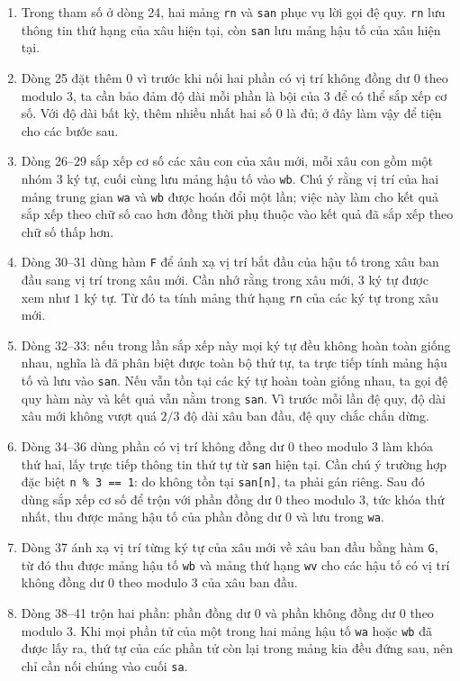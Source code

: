 \documentclass[11pt]{article}
\begin{document}
\begin{enumerate}
  \item Trong tham số ở dòng 24, hai mảng \texttt{rn} và \texttt{san} phục vụ
  lời gọi đệ quy. \texttt{rn} lưu thông tin thứ hạng của xâu hiện tại, còn
  \texttt{san} lưu mảng hậu tố của xâu hiện tại.

  \item Dòng 25 đặt thêm $0$ vì trước khi nối hai phần có vị trí không đồng dư
  $0$ theo modulo $3$, ta cần bảo đảm độ dài mỗi phần là bội của $3$ để có thể
  sắp xếp cơ số. Với độ dài bất kỳ, thêm nhiều nhất hai số $0$ là đủ; ở đây
  làm vậy để tiện cho các bước sau.

  \item Dòng 26--29 sắp xếp cơ số các xâu con của xâu mới, mỗi xâu con gồm
  một nhóm $3$ ký tự, cuối cùng lưu mảng hậu tố vào \texttt{wb}. Chú ý rằng vị
  trí của hai mảng trung gian \texttt{wa} và \texttt{wb} được hoán đổi một lần;
  việc này làm cho kết quả sắp xếp theo chữ số cao hơn đồng thời phụ thuộc vào
  kết quả đã sắp xếp theo chữ số thấp hơn.

  \item Dòng 30--31 dùng hàm \texttt{F} để ánh xạ vị trí bắt đầu của hậu tố
  trong xâu ban đầu sang vị trí trong xâu mới. Cần nhớ rằng trong xâu mới,
  $3$ ký tự được xem như $1$ ký tự. Từ đó ta tính mảng thứ hạng
  \texttt{rn} của các ký tự trong xâu mới.

  \item Dòng 32--33: nếu trong lần sắp xếp này mọi ký tự đều không hoàn toàn
  giống nhau, nghĩa là đã phân biệt được toàn bộ thứ tự, ta trực tiếp tính
  mảng hậu tố và lưu vào \texttt{san}. Nếu vẫn tồn tại các ký tự hoàn toàn
  giống nhau, ta gọi đệ quy hàm này và kết quả vẫn nằm trong \texttt{san}. Vì
  trước mỗi lần đệ quy, độ dài xâu mới không vượt quá $2/3$ độ dài xâu ban
  đầu, đệ quy chắc chắn dừng.

  \item Dòng 34--36 dùng phần có vị trí không đồng dư $0$ theo modulo $3$ làm
  khóa thứ hai, lấy trực tiếp thông tin thứ tự từ \texttt{san} hiện tại. Cần
  chú ý trường hợp đặc biệt \texttt{n \% 3 == 1}: do không tồn tại
  \texttt{san[n]}, ta phải gán riêng. Sau đó dùng sắp xếp cơ số để trộn với
  phần đồng dư $0$ theo modulo $3$, tức khóa thứ nhất, thu được mảng hậu tố
  của phần đồng dư $0$ và lưu trong \texttt{wa}.

  \item Dòng 37 ánh xạ vị trí từng ký tự của xâu mới về xâu ban đầu bằng hàm
  \texttt{G}, từ đó thu được mảng hậu tố \texttt{wb} và mảng thứ hạng
  \texttt{wv} cho các hậu tố có vị trí không đồng dư $0$ theo modulo $3$ của
  xâu ban đầu.

  \item Dòng 38--41 trộn hai phần: phần đồng dư $0$ và phần không đồng dư $0$
  theo modulo $3$. Khi mọi phần tử của một trong hai mảng hậu tố \texttt{wa}
  hoặc \texttt{wb} đã được lấy ra, thứ tự của các phần tử còn lại trong mảng
  kia đều đứng sau, nên chỉ cần nối chúng vào cuối \texttt{sa}.
\end{enumerate}
\end{document}
